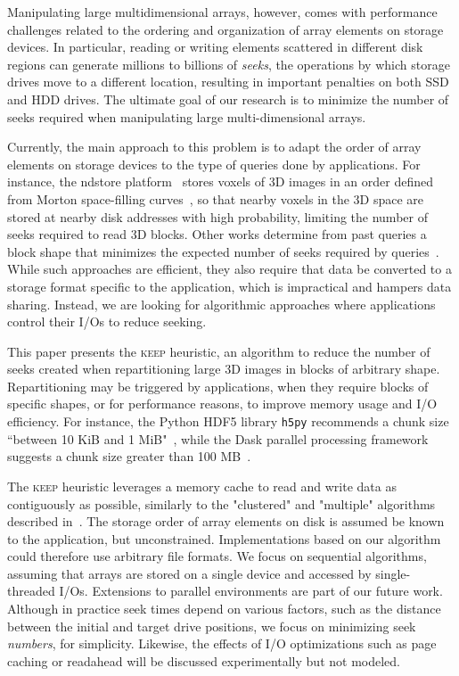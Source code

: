 \documentclass[sigconf, nonacm]{acmart}
\newcommand{\keep}[0]{\textsc{keep}\xspace}
\begin{document}
Manipulating large multidimensional arrays, however, comes with performance
challenges related to the ordering and organization of array elements on
storage devices. In particular, reading or writing elements scattered in different
disk regions can generate millions to billions of \emph{seeks}, the
operations by which storage drives move to a different location, resulting
in important penalties on both SSD and HDD drives. The ultimate goal of our
research is to minimize the number of seeks required when manipulating
large multi-dimensional arrays.

Currently, the main approach to this problem is to adapt the order of array
elements on storage devices to the type of queries done by applications.
For instance, the ndstore platform~\cite{lillaney2018building} stores voxels of 3D images
in an order defined from Morton space-filling curves~\cite{morton1966computer}, so that nearby
voxels in the 3D space are stored at nearby disk addresses with high
probability, limiting the number of seeks required to read 3D blocks. Other works determine from past queries a
block shape that minimizes the expected number of seeks required
by queries~\cite{optimal_chuking}.
While such approaches are efficient, they also require that data
be converted to a storage format specific to the application, which is
impractical and hampers data sharing. Instead, we are looking for
algorithmic approaches where applications control their I/Os to reduce seeking.

This paper presents the \keep heuristic, an algorithm to reduce the
number of seeks created when repartitioning large 3D images in blocks of
arbitrary shape. Repartitioning may be triggered by applications, when they
require blocks of specific shapes, or for performance reasons, to improve
memory usage and I/O efficiency. For instance, the Python HDF5 library
\texttt{h5py} recommends a chunk size ``between 10 KiB and 1
MiB"~\cite{collette_2014}, while the Dask parallel processing framework
~\cite{matthew_rocklin-proc-scipy-2015} suggests a chunk size greater than
100 MB~\cite{rocklin_bourbeau_2019}.

The \keep heuristic leverages a memory cache to read and write data as
contiguously as possible, similarly to the "clustered" and "multiple"
algorithms described in~\cite{seqalgorithms}. The storage order of array
elements on disk is assumed be known to the application, but unconstrained.
Implementations based on our algorithm could therefore use arbitrary file
formats. We focus on sequential algorithms, assuming that arrays are stored
on a single device and accessed by single-threaded I/Os. Extensions to parallel
environments are part of our future work. Although in practice seek times
depend on various factors, such as the distance between the initial and
target drive positions, we focus on minimizing seek \emph{numbers}, for
simplicity. Likewise, the effects of I/O optimizations such as page caching
or readahead will be discussed experimentally but not modeled.
\end{document}
